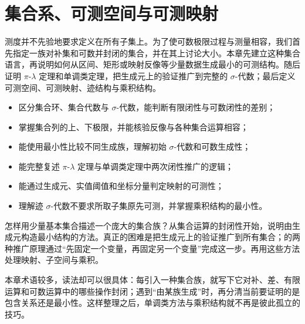 \chapter{集合系、可测空间与可测映射}
\label{b1:ch:01}

\begin{chapterabstract}
测度并不先验地要求定义在所有子集上。为了使可数极限过程与测量相容，我们首先指定一族对补集和可数并封闭的集合，并在其上讨论大小。本章先建立这种集合语言，再说明如何从区间、矩形或映射反像等少量数据生成最小的可测结构。随后证明 \(\pi\)-\(\lambda\) 定理和单调类定理，把生成元上的验证推广到完整的 \(\sigma\)-代数；最后定义可测空间、可测映射、迹结构与乘积结构。
\end{chapterabstract}

\begin{learninggoals}
\begin{itemize}
  \item \label{b1:item:ch01-goal-1}
  区分集合环、集合代数与 \(\sigma\)-代数，能判断有限闭性与可数闭性的差别；
  \item \label{b1:item:ch01-goal-2}
  掌握集合列的上、下极限，并能核验反像与各种集合运算相容；
  \item \label{b1:item:ch01-goal-3}
  能使用最小性比较不同生成族，理解初始 \(\sigma\)-代数和可数生成性；
  \item \label{b1:item:ch01-goal-4}
  能完整复述 \(\pi\)-\(\lambda\) 定理与单调类定理中两次闭性推广的逻辑；
  \item \label{b1:item:ch01-goal-5}
  能通过生成元、实值阈值和坐标分量判定映射的可测性；
  \item \label{b1:item:ch01-goal-6}
  理解迹 \(\sigma\)-代数不要求所取子集原先可测，并掌握乘积结构的最小性。
\end{itemize}
\end{learninggoals}

怎样用少量基本集合描述一个庞大的集合族？从集合运算的封闭性开始，说明由生成元构造最小结构的方法。真正的困难是把生成元上的验证推广到所有集合；的两种推广原理通过“先固定一个变量，再固定另一个变量”完成这一步。再用这些方法处理映射、子空间与乘积。

\ProseParagraphBreak

本章术语较多，读法却可以很具体：每引入一种集合族，就写下它对补、差、有限运算和可数运算中的哪些操作封闭；遇到“由某族生成”时，再分清当前要证明的是包含关系还是最小性。这样整理之后，单调类方法与乘积结构就不再是彼此孤立的技巧。

